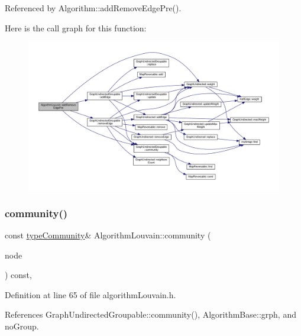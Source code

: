Referenced by Algorithm\+::add\+Remove\+Edge\+Pre().

Here is the call graph for this function\+:
\nopagebreak
\begin{figure}[H]
\begin{center}
\leavevmode
\includegraphics[width=350pt]{classAlgorithmLouvain_a883c922bf2f3c3aadb9db4962c0d8dce_cgraph}
\end{center}
\end{figure}
\mbox{\label{classAlgorithmLouvain_a5f59777e27ab7a3e5accbc1f52b0e51e}} 
\subsubsection{\texorpdfstring{community()}{community()}\hspace{0.1cm}{\footnotesize\ttfamily [1/2]}}
{\footnotesize\ttfamily const \hyperlink{graphUndirectedGroupable_8h_a914da95c9ea7f14f4b7f875c36818556}{type\+Community}\& Algorithm\+Louvain\+::community (\begin{DoxyParamCaption}\item[{const \hyperlink{edge_8h_a5fbd20c46956d479cb10afc9855223f6}{type\+Vertex} \&}]{node }\end{DoxyParamCaption}) const\hspace{0.3cm}{\ttfamily [inline]}, {\ttfamily [private]}}



Definition at line 65 of file algorithm\+Louvain.\+h.



References Graph\+Undirected\+Groupable\+::community(), Algorithm\+Base\+::grph, and no\+Group.



